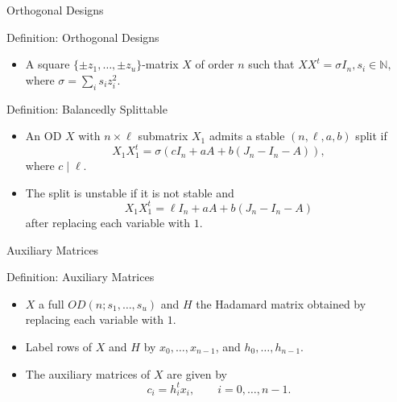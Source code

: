 \documentclass{beamer}
\begin{document}
\begin{frame}{Orthogonal Designs}

  \begin{block}{Definition: Orthogonal Designs}
    \begin{itemize}
    \item A square $\{\pm z_1, \dots, \pm z_u\}$-matrix $X$ of order $n$ such
      that
      $
      XX^t = \sigma I_n, s_i \in \mathbb{N},
      $
      where $\sigma = \sum_i s_iz_i^2$.
    \end{itemize}
  \end{block}

  \pause

  \begin{block}{Definition: Balancedly Splittable \cite[][]{split-od}} 
    \begin{itemize}
    \item An OD $X$ with $n \times \ell$ submatrix $X_1$ admits a stable
      $(n,\ell,a,b)$ split if
        $$
        X_1X_1^t = \sigma(cI_n + aA + b(J_n-I_n-A)),
        $$
        where $c \mid \ell$.
      \item The split is unstable if it is not stable and
        $$
        X_1X_1^t = \ell I_n + aA + b(J_n-I_n-A)
        $$
        after replacing each variable with $1$.
    \end{itemize}
  \end{block}

\end{frame}


\begin{frame}{Auxiliary Matrices}

  \begin{block}{Definition: Auxiliary Matrices}
    \begin{itemize}
      \item $X$ a full $OD(n;s_1, \dots, s_u)$ and $H$ the Hadamard matrix
        obtained by replacing each variable with $1$.
      \item Label rows of $X$ and $H$ by $x_0, \dots, x_{n-1}$, and
        $h_0, \dots, h_{n-1}$.
      \item The auxiliary matrices of $X$ are given by
        $$
        c_i = h_i^tx_i, \qquad i = 0, \dots, n-1. 
        $$
    \end{itemize}
  \end{block}

\end{frame}
\end{document}
